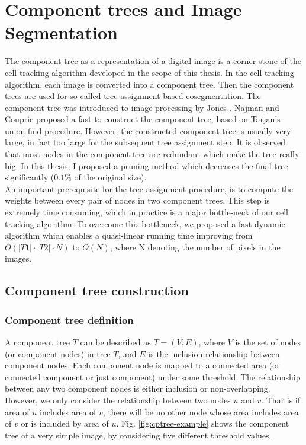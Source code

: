 \chapter{Component trees and Image Segmentation}\label{chapter:cptree} \label{chpt:cptree}
The component tree as a representation of a digital image is a corner stone of the cell tracking algorithm developed in the scope of this thesis. In the cell tracking algorithm, each image is converted into a component tree. Then the component trees are used for so-called tree assignment based cosegmentation. The component tree was introduced to image processing by Jones \cite{jones1999connected}. Najman and Couprie \cite{Najman:04,najman2006building} proposed a fast to construct the component tree, based on Tarjan's union-find procedure. However, the constructed component tree is usually very large, in fact too large for the subsequent tree assignment step. It is observed that most nodes in the component tree are redundant which make the tree really big. In this thesis, I proposed a pruning method which decreases the final tree significantly ($0.1\%$ of the original size).\\
An important prerequisite for the tree assignment procedure, is to compute the weights between every pair of nodes in two component trees. This step is extremely time consuming, which in practice is a major bottle-neck of our cell tracking algorithm. To overcome this bottleneck, we proposed a fast dynamic algorithm which enables a quasi-linear running time improving from $O(|T1|\cdot|T2|\cdot N)$ to $O(N)$, where N denoting the number of pixels in the images.
\section{Component tree construction} \label{sec:cptree-def}
\subsection{Component tree definition}
A component tree $T$ can be described as $T=(V, E)$, where $V$ is the set of nodes (or component nodes) in tree $T$, and $E$ is the inclusion relationship between component nodes. Each component node is mapped to a connected area (or connected component or just component) under some threshold. The relationship between any two component nodes is either inclusion or non-overlapping. However, we only consider the relationship between two nodes $u$ and $v$. That is if area of $u$ includes area of $v$, there will be no other node whose area includes area of $v$ or is included by area of $u$. Fig. \ref{fig:cptree-example} shows the component tree of a very simple image, by considering five different threshold values.

